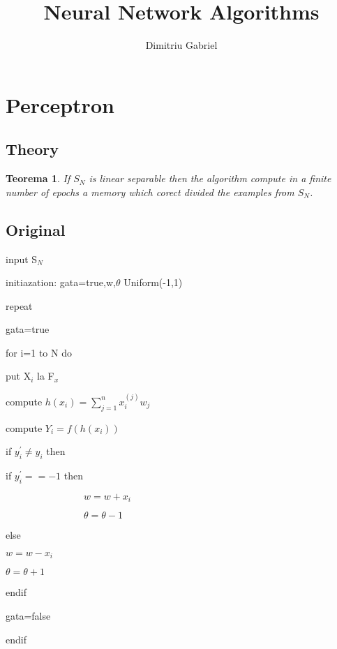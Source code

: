 \documentclass{article}
\newtheorem{theorem}{Teorema}
\begin{document}
\title{Neural Network Algorithms}
\author{Dimitriu Gabriel}
\maketitle
\tableofcontents

\section{Perceptron}

\subsection{Theory}

\begin{theorem}
If $S_{N}$ is linear separable then the algorithm compute in a finite number
of epochs a memory which corect divided the examples from $S_{N}$.
\end{theorem}

\subsection{Original}

input S$_{N}$

initiazation: gata=true,w,$\theta $ Uniform(-1,1)

repeat

\qquad gata=true

\qquad for i=1 to N do

\qquad \qquad put X$_{i}$ la F$_{x}$

\qquad \qquad compute $h(x_{i})=\sum_{j=1}^{n}x_{i}^{(j)}w_{j}$

\qquad \qquad compute $Y_{i}=f(h(x_{i}))$

\qquad \qquad if $y_{i}^{\prime }\neq y_{i}$ then

\qquad \qquad \qquad if $y_{i}^{\prime }==-1$ then

$\qquad \qquad \qquad \qquad w=w+x_{i}$

$\qquad \qquad \qquad \qquad \theta =\theta -1$

\qquad \qquad \qquad else

\qquad \qquad \qquad \qquad $w=w-x_{i}$

\qquad \qquad \qquad \qquad $\theta =\theta +1$

\qquad \qquad \qquad endif

\qquad \qquad \qquad gata=false

\qquad \qquad endif
\end{document}
